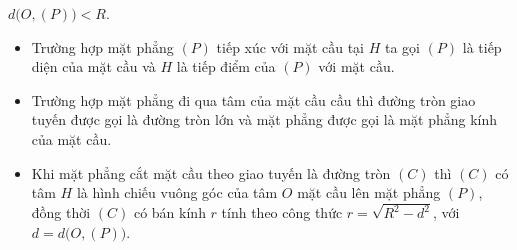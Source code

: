 \begin{khung}
\begin{itemize}
	$d\big(O,(P)\big)<R$.
	\end{itemize}
	\begin{note}
	\begin{itemize}
	\item Trường hợp mặt phẳng $(P)$ tiếp xúc với mặt cầu tại $H$ ta gọi $(P)$ là tiếp diện của mặt cầu và $H$ là tiếp điểm của $(P)$ với mặt cầu.
	\item Trường hợp mặt phẳng đi qua tâm của mặt cầu cầu thì đường tròn giao tuyến được gọi là đường tròn lớn và mặt phẳng được gọi là mặt phẳng kính của mặt cầu.
	\item Khi mặt phẳng cắt mặt cầu theo giao tuyến là đường tròn $(C)$ thì $(C)$ có tâm $H$ là hình chiếu vuông góc của tâm $O$ mặt cầu lên mặt phẳng $(P)$, đồng thời $(C)$ có bán kính $r$ tính theo công thức $r=\sqrt{R^2-d^2}$, với $d=d\big(O,(P)\big)$.
 	\end{itemize}
	\end{note}
\end{khung}
